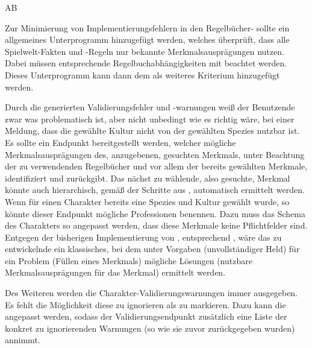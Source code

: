 \begin{enumerateWithCode}{AB}

    \item Zur Minimierung von Implementierungsfehlern in den Regelbücher- sollte ein allgemeines Unterprogramm hinzugefügt werden, welches überprüft, dass alle Spielwelt-Fakten und -Regeln nur bekannte Merkmalsausprägungen nutzen.
    Dabei müssen entsprechende Regelbuchabhängigkeiten mit beachtet werden.
    Dieses Unterprogramm kann dann dem  als weiteres Kriterium hinzugefügt werden.

    \item Durch die generierten Validierungsfehler und -warnungen weiß der Benutzende zwar was problematisch ist, aber nicht unbedingt wie es richtig wäre, \zB bei einer Meldung, dass die gewählte Kultur nicht von der gewählten Spezies nutzbar ist.
    Es sollte ein Endpunkt bereitgestellt werden, welcher mögliche Merkmalsausprägungen des, anzugebenen, gesuchten Merkmals, unter Beachtung der zu verwendenden Regelbücher und vor allem der bereits gewählten Merkmale, identifiziert und zurückgibt.
    Das nächst zu wählende, also gesuchte, Merkmal könnte auch hierarchisch, gemäß der Schritte aus , automatisch ermittelt werden.
    Wenn \zB für einen Charakter bereits eine Spezies und Kultur gewählt wurde, so könnte dieser Endpunkt mögliche Professionen benennen.
    Dazu muss das Schema des Charakters so angepasst werden, dass diese Merkmale keine Pflichtfelder sind.
    Entgegen der bisherigen Implementierung von , entsprechend , wäre das zu entwickelnde  ein klassisches, bei dem unter Vorgaben (unvollständiger Held) für ein Problem (Füllen eines Merkmals) mögliche Lösungen (nutzbare Merkmalsausprägungen für das Merkmal) ermittelt werden.

    \item Des Weiteren werden die Charakter-Validierungswarnungen immer ausgegeben.
    Es fehlt die Möglichkeit diese zu ignorieren \bzw als  zu markieren.
    Dazu kann die  angepasst werden, sodass der Validierungsendpunkt zusätzlich eine Liste der konkret zu ignorierenden Warnungen (so wie sie zuvor zurückgegeben wurden) annimmt.


\end{enumerateWithCode}
